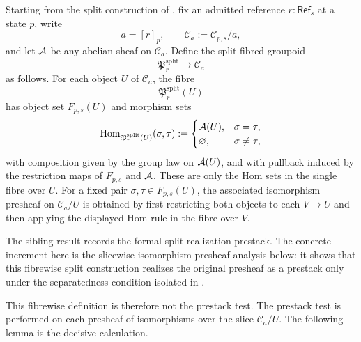 ﻿\begin{definition}\label{def:split-fibred-groupoid}
Starting from the split construction of
\cite[Proposition~4.12]{HomologicalVisibilityGluingObstructions2026}, fix an
admitted reference $r:\mathsf{Ref}_s$ at a state $p$, write
\[
a=[r]_p,
\qquad
\mathcal C_a:=\mathcal C_{p,s}/a,
\]
and let $\mathcal{A}$ be any abelian sheaf on $\mathcal C_a$. Define the split fibred groupoid
\[
\mathfrak P_r^{\mathrm{split}}\to \mathcal C_a
\]
as follows. For each object $U$ of $\mathcal C_a$, the fibre
\[
\mathfrak P_r^{\mathrm{split}}(U)
\]
has object set $F_{p,s}(U)$ and morphism sets
\[
\mathrm{Hom}_{\mathfrak P_r^{\mathrm{split}}(U)}(\sigma,\tau)
:=
\begin{cases}
\mathcal{A}(U), & \sigma=\tau,\\
\varnothing, & \sigma\neq\tau,
\end{cases}
\]
with composition given by the group law on $\mathcal{A}(U)$, and with pullback induced by the restriction maps of $F_{p,s}$ and $\mathcal{A}$.
These are only the Hom sets in the single fibre over $U$. For a fixed pair
$\sigma,\tau\in F_{p,s}(U)$, the associated isomorphism presheaf on
$\mathcal C_a/U$ is obtained by first restricting both objects to each
$V\to U$ and then applying the displayed Hom rule in the fibre over $V$.
\end{definition}

\begin{remark}
The sibling result records the formal split realization prestack. The concrete
increment here is the slicewise isomorphism-presheaf analysis below: it shows
that this fibrewise split construction realizes the original presheaf as a
prestack only under the separatedness condition isolated in
.
\end{remark}

This fibrewise definition is therefore not the prestack test. The prestack test
is performed on each presheaf of isomorphisms over the slice $\mathcal C_a/U$.
The following lemma is the decisive calculation.

